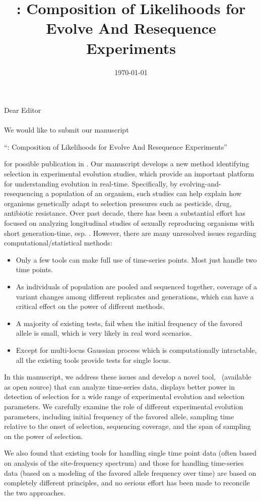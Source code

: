 \documentclass[11pt]{article}
\title{\comale: Composition of Likelihoods for Evolve And Resequence 
Experiments}
\date{\today}
\def\genetics{\text{\sc{Genetics}}}
\begin{document}
\noindent Dear Editor\\
\noindent\genetics\\

\noindent We would like to submit our manuscript  

``\comale: Composition of Likelihoods for Evolve And Resequence Experiments''

\noindent for possible publication in \genetics.
Our manuscript develops a new method identifying selection in experimental 
evolution studies, which provide an important platform for understanding 
evolution in real-time. 
Specifically, by evolving-and-resequencing a population of an organism, such 
studies 
can help explain how organisms genetically adapt to 
selection pressures such as pesticide, drug, antibiotic resistance. Over past 
decade, there has been a substantial effort has focused on analyzing 
longitudinal studies of sexually reproducing organisms with short 
generation-time, esp. 
\dmel. However, there are many unresolved 
issues regarding computational/statistical methods:
\begin{itemize}
	\item Only a few tools can make full use of time-series points. Most just 
	handle	two time points. 
	\item As individuals of population are pooled and sequenced together, 
	coverage of a variant changes among different replicates and generations,
	which can have a critical effect on the power of different methods.
	\item A majority of existing tests, fail when the 
	initial 
	frequency of the favored allele is small, which is very likely in real word 
	scenarios.
	\item Except for multi-locus Gaussian process which is computationally 
	intractable, all the existing tools provide tests for single locus.
\end{itemize}



In this manuscript, we address these issues and develop a novel tool, \comale\
(available as open source) that can analyze time-series data, displays better 
power in detection of selection for a wide range of experimental evolution and 
selection parameters. We carefully examine the 
role of different experimental evolution parameters, including initial 
frequency of the favored allele, sampling time relative to the onset of 
selection, sequencing coverage, and the span of sampling on the power of 
selection.

We also found that existing tools for handling single time point data 
(often 
based on analysis of the site-frequency spectrum) and those for handling 
time-series data (based on a modeling of the favored allele frequency over 
time) are based on completely different principles, and no serious effort 
has been made to reconcile the two approaches.
\end{document}

